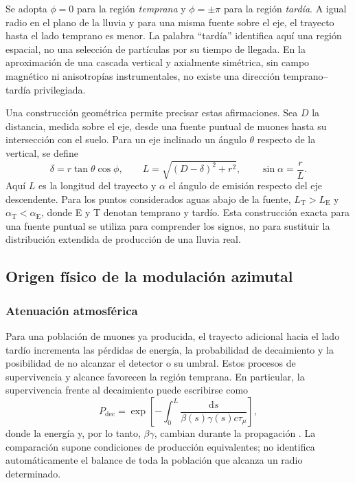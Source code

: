 Se adopta $\phi=0$ para la región \textit{temprana} y $\phi=\pm\pi$ para la región \textit{tardía}. A igual radio en el plano de la lluvia y para una misma fuente sobre el eje, el trayecto hasta el lado temprano es menor. La palabra ``tardía'' identifica aquí una región espacial, no una selección de partículas por su tiempo de llegada. En la aproximación de una cascada vertical y axialmente simétrica, sin campo magnético ni anisotropías instrumentales, no existe una dirección temprano--tardía privilegiada.

Una construcción geométrica permite precisar estas afirmaciones. Sea $D$ la distancia, medida sobre el eje, desde una fuente puntual de muones hasta su intersección con el suelo. Para un eje inclinado un ángulo $\theta$ respecto de la vertical, se define
\begin{equation}
\delta=r\tan\theta\cos\phi,\qquad
L=\sqrt{(D-\delta)^2+r^2},\qquad
\sin\alpha=\frac{r}{L}.
\label{eq:geometria_fuente_muonica}
\end{equation}
Aquí $L$ es la longitud del trayecto y $\alpha$ el ángulo de emisión respecto del eje descendente. Para los puntos considerados aguas abajo de la fuente, $L_{\mathrm{T}}>L_{\mathrm{E}}$ y $\alpha_{\mathrm{T}}<\alpha_{\mathrm{E}}$, donde E y T denotan temprano y tardío. Esta construcción exacta para una fuente puntual se utiliza para comprender los signos, no para sustituir la distribución extendida de producción de una lluvia real.

\subsection{Origen físico de la modulación azimutal}
\label{subsec:origen_fisico}

\subsubsection{Atenuación atmosférica}
\label{subsubsec:atenuacion}

Para una población de muones ya producida, el trayecto adicional hacia el lado tardío incrementa las pérdidas de energía, la probabilidad de decaimiento y la posibilidad de no alcanzar el detector o su umbral. Estos procesos de supervivencia y alcance favorecen la región temprana. En particular, la supervivencia frente al decaimiento puede escribirse como
\begin{equation}
P_{\mathrm{dec}}=\exp\left[-\int_0^L
\frac{\mathrm{d}s}{\beta(s)\gamma(s)c\tau_\mu}\right],
\end{equation}
donde la energía y, por lo tanto, $\beta\gamma$, cambian durante la propagación \cite{Cazon2012}. La comparación supone condiciones de producción equivalentes; no identifica automáticamente el balance de toda la población que alcanza un radio determinado.


